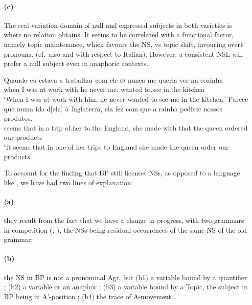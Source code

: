 \documentclass[output=paper]{langsci/langscibook}
\begin{document}
\paragraph*{(c)} The real variation domain of null and expressed subjects in
both varieties is where no  relation obtains. It seems to be correlated
with a functional factor, namely topic maintenance, which favours the NS, vs
topic shift, favouring overt pronouns. (cf.\ also \citealt{DeOliveira2000} and
\citealt{Marins2009} with respect to Italian). However, a consistent NSL will
prefer a null subject even in anaphoric contexts.

\ea%
    \label{ex:key:26.21}
    \ea
	\gll	Quando eu estava a trabalhar com ele \textbf{$\varnothing$} nunca me     queria ver na cozinha\\
            when     I   was     at work       with he {} never  me.\Cl{} wanted to.see in.the kitchen\\
	\glt	\enquote*{When I was at work with him, he never wanted to see me in the kitchen.}
    \ex
	\gll	Parece que numa ida d[ela]     à   Inglaterra, ela fez     com que   a rainha pedisse nossos produtos.\\
			seems   that in.a   trip of.her to.the England,    she made with that  the queen ordered our products\\
	\glt	\enquote*{It seems that in one of her trips to England she made the queen order our products.}
    \z
\z

To account for the finding that \gls{BP} still
licenses NSs, as opposed to a language like , we have had two
lines of explanation:

\paragraph*{(a)} they result from the fact that we have a change in progress,
with two grammars in competition (\citealt{Duarte1993,Duarte1995};
\citealt{Kato2000}), the NSs being residual occurrences of the  same NS of the
old grammar;

\paragraph*{(b)} the NS in \gls{BP} is not a
pronominal Agr,  but (b1) a variable bound by a quantifier
\parencite{NegraoMuller1996}; (b2) a variable or an anaphor
\parencite{FigueiredoSilva2000}; (b3) a variable bound by a Topic, the subject
in \gls{BP} being in A’-position \citep{Modesto2000};
(b4) the trace of A-movement
\parencite{Ferreira2004,Rodrigues2004,MartinsNunes2009}.
\end{document}
